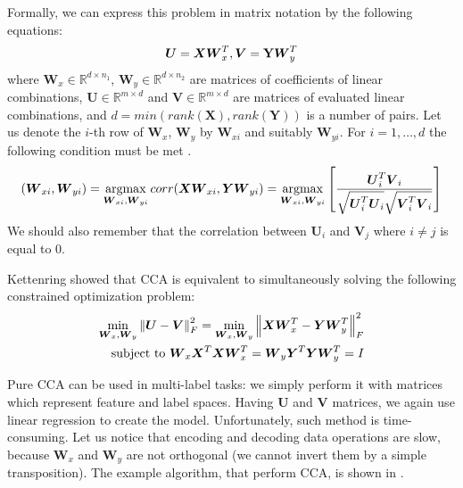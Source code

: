 Formally, we can express this problem in matrix notation by the following equations:
\begin{equation}\label{eq:cca1}
    \boldsymbol{U}=\boldsymbol{X}\boldsymbol{W}_x^T,   \boldsymbol{V}=\bold{Y}\boldsymbol{W}_y^T    
\end{equation}
where $\boldsymbol{W}_x \in \mathbb{R}^{d \times n_1}$, $\boldsymbol{W}_y \in \mathbb{R}^{d \times n_2}$ are matrices of coefficients of linear combinations, $\boldsymbol{U} \in \mathbb{R}^{m \times d}$ and $\boldsymbol{V} \in \mathbb{R}^{m \times d}$ are matrices of evaluated linear combinations, and $d=min(rank(\boldsymbol{X}), rank(\boldsymbol{Y}))$ is a number of pairs. Let us denote the $i$-th row of $\boldsymbol{W}_x$, $\boldsymbol{W}_y$ by $\boldsymbol{W}_{xi}$ and suitably $\boldsymbol{W}_{yi}$. For $i=1,\ldots,d$ the following condition must be met \citep{William}.
\begin{equation}\label{eq:cca2}
    (\boldsymbol{W}_{xi}, \boldsymbol{W}_{yi})=\operatorname*{argmax}_{\boldsymbol{W}_{xi}, \boldsymbol{W}_{yi}} corr(\boldsymbol{X}\boldsymbol{W}_{xi}, \boldsymbol{Y}\boldsymbol{W}_{yi}) = \operatorname*{argmax}_{\boldsymbol{W}_{xi}, \boldsymbol{W}_{yi}} \left[\frac{\boldsymbol{U}^{T}_i\boldsymbol{V}_i}{\sqrt{\boldsymbol{U}^T_i\boldsymbol{U}_i}\sqrt{\boldsymbol{V}^{T}_i\boldsymbol{V}_i}}\right] 
\end{equation}
We should also remember that the correlation between $\boldsymbol{U}_i$ and $\boldsymbol{V}_j$ where $i\neq j$ is equal to $0$.

Kettenring \citep{Kettenring} showed that CCA is equivalent to simultaneously solving the following constrained optimization problem:
\begin{equation}\label{eq:cca3}
\begin{split}
    \min_{\boldsymbol{W}_x, \boldsymbol{W}_y} \left\lVert\boldsymbol{U}-\boldsymbol{V}\right\rVert_{F}^2 = \min_{\boldsymbol{W}_x, \boldsymbol{W}_y} \left\lVert\boldsymbol{X}\boldsymbol{W}_x^T-\boldsymbol{Y}\boldsymbol{W}_y^T\right\rVert_{F}^2 \\ 
    \text{   subject to   } \boldsymbol{W}_x\boldsymbol{X}^T\boldsymbol{X}\boldsymbol{W}_x^T=\boldsymbol{W}_y\boldsymbol{Y}^T\boldsymbol{Y}\boldsymbol{W}_y^T=I   
\end{split}
\end{equation}

Pure CCA can be used in multi-label tasks: we simply perform it with matrices which represent feature and label spaces. Having $\boldsymbol{U}$ and $\boldsymbol{V}$ matrices, we again use linear regression to create the model. Unfortunately, such method is time-consuming. Let us notice that encoding and decoding data operations are slow, because $\boldsymbol{W}_x$ and $\boldsymbol{W}_y$ are not orthogonal (we cannot invert them by a simple transposition). The example algorithm, that perform CCA, is shown in . 

